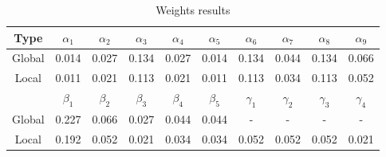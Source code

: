 \documentclass[12pt]{article}
\begin{document}
		{
			\fontsize{10}{14}\selectfont
			{
				\begin{longtable}{c|ccccccccc}
					\caption{Weights results}
					\label{tb:weights}\\
					
					\toprule
					Type&$\alpha_1$&$\alpha_2$&$\alpha_3$&$\alpha_4$&$\alpha_5$&$\alpha_6$&$\alpha_7$&$\alpha_8$&$\alpha_9$\\
					\toprule
					Global&0.014&0.027&0.134&0.027&0.014&0.134&0.044&0.134&0.066\\
					Local&0.011&0.021&0.113&0.021&0.011&0.113&0.034&0.113&0.052\\
					\toprule
					\toprule
					&$\beta_1$&$\beta_2$&$\beta_3$&$\beta_4$&$\beta_5$&$\gamma_1$&$\gamma_2$&$\gamma_3$&$\gamma_4$\\
					\toprule
					Global&0.227&0.066&0.027&0.044&0.044&-&-&-&-\\
					Local&0.192&0.052&0.021&0.034&0.034&0.052&0.052&0.052&0.021\\
					\bottomrule
				\end{longtable}
			}
		}	
	
\end{document}
